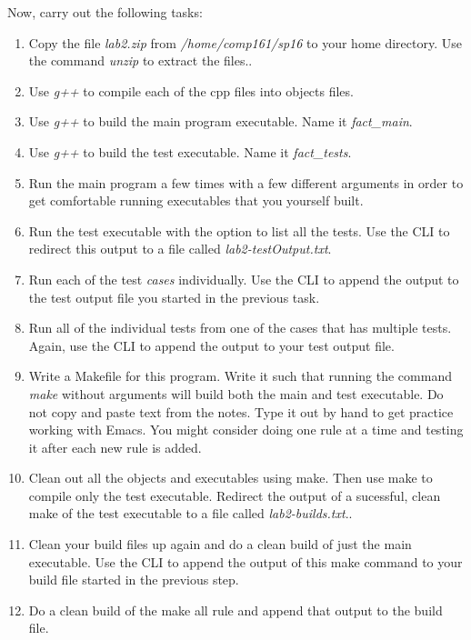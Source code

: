\documentclass[]{tufte-handout}
\begin{document}
Now, carry out the following tasks:
\begin{enumerate}
\item Copy the file \textit{lab2.zip} from \textit{/home/comp161/sp16} to your home directory. Use the command \textit{unzip} to extract the files..
\item Use \textit{g++} to compile each of the cpp files into objects files.
\item Use \textit{g++} to build the main program executable. Name it \textit{fact\_main}. 
\item Use \textit{g++} to build the test executable. Name it \textit{fact\_tests}.
\item Run the main program a few times with a few different arguments in order to get comfortable running executables that you yourself built.
\item Run the test executable with the option to list all the tests. Use the CLI to redirect this output to a file called \textit{lab2-testOutput.txt}. 
\item Run each of the test \textit{cases} individually. Use the CLI to append the output to the test output file you started in the previous task. 
\item Run all of the individual tests from one of the cases that has multiple tests. Again, use the CLI to append the output to your test output file.
\item Write a Makefile for this program. Write it such that running the command \textit{make} without arguments will build both the main and test executable. Do not copy and paste text from the notes. Type it out by hand to get practice working with Emacs. You might consider doing one rule at a time and testing it after each new rule is added. 
\item Clean out all the objects and executables using make. Then use make to compile only the test executable. Redirect the output of a sucessful, clean make of the test executable to a file called \textit{lab2-builds.txt}..
\item Clean your build files up again and do a clean build of just the main executable. Use the CLI to append the output of this make command to your build file started in the previous step.
\item Do a clean build of the make all rule and append that output to the build file. 
\end{enumerate}
\end{document}
